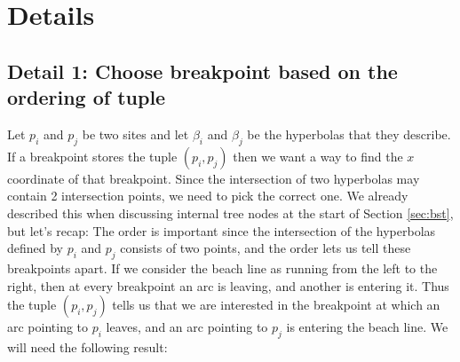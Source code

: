 \section{Details}

\subsection*{Detail 1: Choose breakpoint based on the ordering of tuple}
Let $p_i$ and $p_j$ be two sites and let $\beta_i$ and $\beta_j$ be the hyperbolas that they describe. If a breakpoint stores the tuple $(p_i, p_j)$ then we want a way to find the $x$ coordinate of that breakpoint. Since the intersection of two hyperbolas may contain 2 intersection points, we need to pick the correct one. We already described this when discussing internal tree nodes at the start of Section \ref{sec:bst}, but let's recap: The order is important since the intersection of the hyperbolas defined by $p_i$ and $p_j$ consists of two points, and the order lets us tell these breakpoints apart. If we consider the beach line as running from the left to the right, then at every breakpoint an arc is leaving, and another is entering it. Thus the tuple $(p_i, p_j)$ tells us that we are interested in the breakpoint at which an arc pointing to $p_i$ leaves, and an arc pointing to $p_j$ is entering the beach line. We will need the following result:

